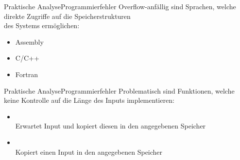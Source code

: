 \begin{frame}{Praktische Analyse}{Programmierfehler}
    Overflow-anfällig sind Sprachen, welche direkte Zugriffe auf die Speicherstrukturen\\ des Systems ermöglichen:
    \begin{itemize}
        \vspace{1em}
        \item Assembly
        \item C/C++
        \item Fortran
    \end{itemize}
\end{frame}

\begin{frame}{Praktische Analyse}{Programmierfehler}
    Problematisch sind Funktionen, welche
    keine Kontrolle auf die Länge des Inputs implementieren: %
    \begin{itemize}
        \vspace{1em}
        \item {}\\ Erwartet Input und kopiert diesen in den angegebenen Speicher
        \vspace{1em}
        \item {}\\ Kopiert einen Input
        in den angegebenen Speicher
    \end{itemize}
\end{frame}


